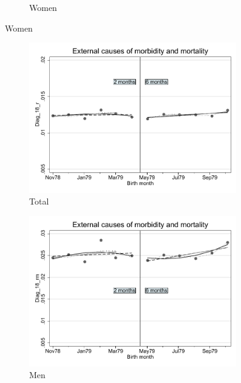 \documentclass[a4paper ]{article}
\begin{document}
\begin{figure}[h!]
\begin{subfigure}[t]{0.31\textwidth}
		\caption{Women}
	\end{subfigure}
\end{figure}
\newpage
\begin{figure}[h]
	\centering
	\begin{subfigure}[t]{0.31\textwidth}
		\centering
		\includegraphics[width=0.99\textwidth]{R1_RD_Diag_18_r_fits}
		\caption{Total}		
	\end{subfigure}
	\begin{subfigure}[t]{0.31\textwidth}
		\centering
		\includegraphics[width=0.99\textwidth]{R1_RD_Diag_18_rm_fits}
		\caption{Men}		
	\end{subfigure}
	\quad
	\begin{subfigure}[t]{0.31\textwidth}

\end{subfigure}
\end{figure}
\end{document}
